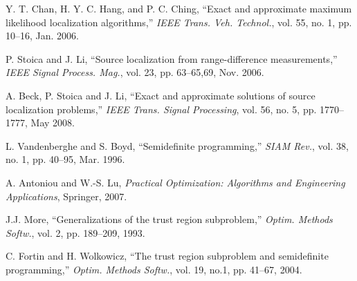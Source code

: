 \begin{frame} [t,allowframebreaks]
\begin{thebibliography}{99}
Y. T. Chan, H. Y. C. Hang, and P. C. Ching, ``Exact and approximate maximum likelihood localization algorithms,'' {\em IEEE Trans. Veh. Technol.}, vol. 55, no. 1, pp. 10--16, Jan. 2006.

P. Stoica and J. Li, ``Source localization from range-difference measurements,'' {\em IEEE Signal Process. Mag.}, vol. 23, pp. 63--65,69, Nov. 2006.

A. Beck, P. Stoica and J. Li,  ``Exact and approximate solutions of source localization problems,'' {\em IEEE Trans. Signal Processing}, vol. 56, no. 5, pp. 1770--1777, May 2008.

L. Vandenberghe and S. Boyd, ``Semidefinite programming,'' {\em SIAM Rev.}, vol. 38, no. 1, pp. 40--95, Mar. 1996.

A. Antoniou and W.-S. Lu, {\em Practical Optimization: Algorithms and Engineering Applications}, Springer, 2007.

J.J. More, ``Generalizations of the trust region subproblem,'' {\em Optim. Methods Softw.}, vol. 2, pp. 189--209, 1993.

C. Fortin and H. Wolkowicz, ``The trust region subproblem and semidefinite programming,'' {\em Optim. Methods Softw.}, vol. 19, no.1, pp. 41--67, 2004.

\end{thebibliography}


\end{frame}